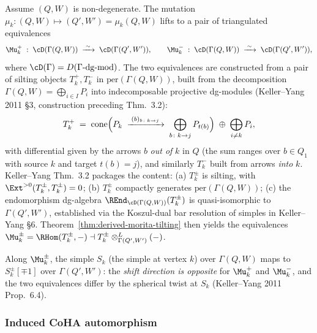 \begin{theorem}
\label{thm:keller-yang-mutation}
Assume $(Q, W)$ is non-degenerate. The mutation
$\mu_k \colon (Q, W) \mapsto (Q', W') = \mu_k(Q, W)$ lifts to a pair of
triangulated equivalences
\[
 \Mu_k^{+} \;:\; \cD(\Gamma(Q, W)) \;\xrightarrow{\;\sim\;}\;
 \cD(\Gamma(Q', W')),
 \qquad
 \Mu_k^{-} \;:\; \cD(\Gamma(Q, W)) \;\xrightarrow{\;\sim\;}\;
 \cD(\Gamma(Q', W')),
\]
where $\cD(\Gamma) = D(\Gamma\text{-}\mathrm{dg\text{-}mod})$. The two
equivalences are constructed from a pair of silting objects $T_k^{+},
T_k^{-}$ in $\mathrm{per}(\Gamma(Q, W))$, built from the decomposition
$\Gamma(Q, W) = \bigoplus_{i \in I} P_i$ into indecomposable projective
dg-modules (Keller--Yang 2011 \S3, construction preceding Thm.~3.2):
\[
 T_k^{+} \;=\; \mathrm{cone}\Bigl(P_k \;\xrightarrow{\;(b)_{b \colon k \to j}\;}\;
 \bigoplus_{b \colon k \to j} P_{t(b)}\Bigr) \;\oplus\; \bigoplus_{i \neq k} P_i,
\]
with differential given by the arrows $b$ \emph{out of} $k$ in $Q$ (the sum
ranges over $b \in Q_1$ with source $k$ and target $t(b) = j$), and
similarly $T_k^{-}$ built from arrows \emph{into} $k$. Keller--Yang Thm.~3.2
packages the content: (a) $T_k^{\pm}$ is silting, with $\Ext^{>0}(T_k^{\pm},
T_k^{\pm}) = 0$; (b) $T_k^{\pm}$ compactly generates $\mathrm{per}(\Gamma(Q, W))$;
(c) the endomorphism dg-algebra $\REnd_{\cD(\Gamma(Q, W))}(T_k^{\pm})$ is
quasi-isomorphic to $\Gamma(Q', W')$, established via the Koszul-dual bar
resolution of simples in Keller--Yang \S6. Theorem~\ref{thm:derived-morita-tilting}
then yields the equivalences
$\Mu_k^{\pm} = \RHom(T_k^{\pm}, -) \dashv T_k^{\pm} \otimes^{L}_{\Gamma(Q', W')} (-)$.

Along $\Mu_k^{\pm}$, the simple $S_k$ (the simple at vertex $k$) over
$\Gamma(Q, W)$ maps to $S_k^{\pm}[\mp 1]$ over $\Gamma(Q', W')$: the
\emph{shift direction is opposite} for $\Mu_k^{+}$ and $\Mu_k^{-}$, and the
two equivalences differ by the spherical twist at $S_k$ (Keller--Yang 2011
Prop.~6.4).
\end{theorem}

\subsubsection{Induced CoHA automorphism}

